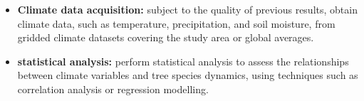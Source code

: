 \begin{itemize}
  \item \textbf{Climate data acquisition:} subject to the quality of previous results, obtain climate data, such as temperature, precipitation, and soil moisture, from gridded climate datasets covering the study area or global averages.
  
  \item \textbf{statistical analysis:} perform statistical analysis to assess the relationships between climate variables and tree species dynamics, using techniques such as correlation analysis or regression modelling.
  
\end{itemize}